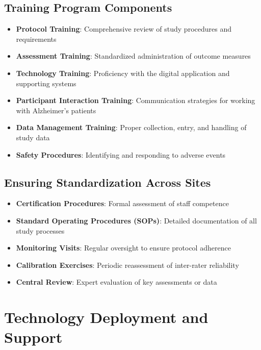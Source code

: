 \subsection{Training Program Components}
\begin{itemize}
    \item \textbf{Protocol Training}: Comprehensive review of study procedures and requirements
    
    \item \textbf{Assessment Training}: Standardized administration of outcome measures
    
    \item \textbf{Technology Training}: Proficiency with the digital application and supporting systems
    
    \item \textbf{Participant Interaction Training}: Communication strategies for working with Alzheimer's patients
    
    \item \textbf{Data Management Training}: Proper collection, entry, and handling of study data
    
    \item \textbf{Safety Procedures}: Identifying and responding to adverse events
\end{itemize}

\subsection{Ensuring Standardization Across Sites}
\begin{itemize}
    \item \textbf{Certification Procedures}: Formal assessment of staff competence
    
    \item \textbf{Standard Operating Procedures (SOPs)}: Detailed documentation of all study processes
    
    \item \textbf{Monitoring Visits}: Regular oversight to ensure protocol adherence
    
    \item \textbf{Calibration Exercises}: Periodic reassessment of inter-rater reliability
    
    \item \textbf{Central Review}: Expert evaluation of key assessments or data
\end{itemize}

\section{Technology Deployment and Support}
